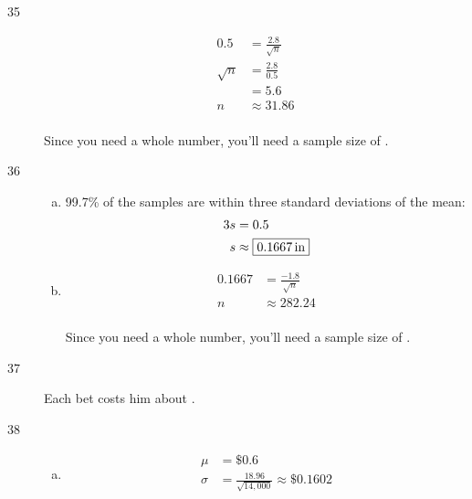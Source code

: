 \documentclass[letterpaper, landscape]{exam}
\newcommand{\cent}{\textcent\xspace}
\begin{document}
\begin{description}
      \item[35]
        \begin{align*}
          0.5      & = \frac{2.8}{\sqrt{n}} \\
          \sqrt{n} & = \frac{2.8}{0.5} \\
                   & = 5.6 \\
          n        & \approx 31.86 \\
        \end{align*}

        Since you need a whole number, you'll need a sample size of 
        .

      \item[36]
        \begin{enumerate}[(a)]
          \item 99.7\% of the samples are within three standard deviations of the
            mean:
            \begin{align*}
              3s & = 0.5 \\
              s  & \approx \boxed{ \unit[0.1667]{in} } \\
            \end{align*}

          \item 
            \begin{align*}
              0.1667 & = \frac{-1.8}{\sqrt{n}} \\
              n    & \approx 282.24 \\
            \end{align*}

            Since you need a whole number, you'll need a sample size of 
            .
        \end{enumerate}

      \item[37] Each bet costs him about \fbox{ 40\cent }.

      \item[38]
        \begin{enumerate}[(a)]
          \item 
            \begin{align*}
              \mu    & = \boxed{ \$0.6 } \\
              \sigma & = \frac{18.96}{\sqrt{14,000}} \approx \boxed{ \$0.1602 } \\
            \end{align*}
            

\end{enumerate}
\end{description}
\end{document}
